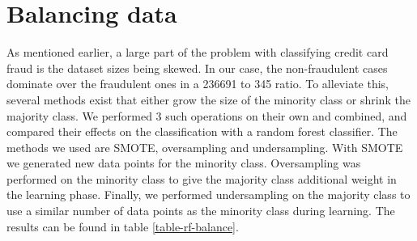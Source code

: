 \section*{Balancing data}

As mentioned earlier, a large part of the problem with classifying credit card fraud is the dataset sizes being skewed. In our case, the non-fraudulent cases dominate over the fraudulent ones in a 236691 to 345 ratio. To alleviate this, several methods exist that either grow the size of the minority class or shrink the majority class. We performed 3 such operations on their own and combined, and compared their effects on the classification with a random forest classifier. The methods we used are SMOTE, oversampling and undersampling. With SMOTE we generated new data points for the minority class. Oversampling was performed on the minority class to give the majority class additional weight in the learning phase. Finally, we performed undersampling on the majority class to use a similar number of data points as the minority class during learning. The results can be found in table \ref{table-rf-balance}.

